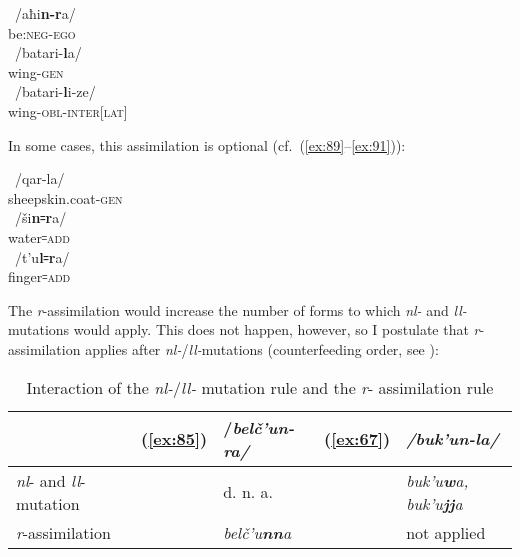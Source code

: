 \documentclass[output=paper]{langsci/langscibook}
\begin{document}
\ex \label{ex:86} %
~/{aħi\textbf{n-r}a}/\\
{be}:\textsc{neg}-\textsc{ego}\\

\ex \label{ex:87} %
~/{batari-\textbf{l}a}/\\
wing-\textsc{gen}\\

\ex \label{ex:88} %
~/{batari-\textbf{l}i-ze}/\\
wing-\textsc{obl}-\textsc{inter}[\textsc{lat}]\\
\z

In some cases, this assimilation is optional (cf.\ (\ref{ex:89}–\ref{ex:91})):

\ea \label{ex:89} %
~/{qar-la}/\\
sheepskin.coat-\textsc{gen}\\

\ex \label{ex:90} %
~/{ši\textbf{n꞊r}a}/\\
water꞊\textsc{add}\\

\ex \label{ex:91} %
~/{t'u\textbf{l꞊r}a}/\\
finger꞊\textsc{add}\\
\z

The \emph{r}-assimilation would increase the number of forms to which
\emph{nl-} and \emph{ll-}mutations would apply. This does not happen,
however, so I postulate that \emph{r}-assimilation applies after
\emph{nl-}/\emph{ll-}mutations (counterfeeding order, see \citealt{kiparsky1968}): %


\begin{table}[h]
  \caption{Interaction of the \emph{nl-}/\emph{ll-} mutation rule and the
\emph{r}- assimilation rule}\label{t3-4}

\begin{tabular}{@{}ll@{ }ll@{ }l@{}}
\toprule
& (\ref{ex:85}) & /\emph{belč'u\textbf{n-r}a/} & (\ref{ex:67}) &
\emph{/buk'u\textbf{n-l}a/}\tabularnewline \midrule
\emph{nl}- and \emph{ll}-mutation & & d. n. a. & &
\emph{buk'u\textbf{w}a, buk'u\textbf{jj}a}\tabularnewline
\emph{r}-assimilation & & \emph{belč'u\textbf{nn}a} & & not
applied\tabularnewline
\bottomrule
\end{tabular}
\end{table}
\end{document}
